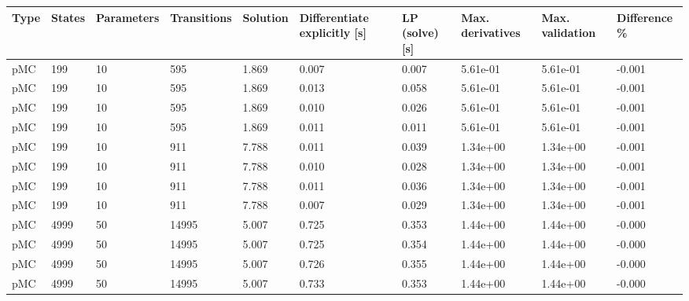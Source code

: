 \begin{tabular}{llllllllll}
\toprule
Type & States & Parameters & Transitions &  Solution & Differentiate explicitly [s] & LP (solve) [s] & Max. derivatives & Max. validation & Difference \% \\
\midrule
 pMC &    199 &         10 &         595 &     1.869 &                        0.007 &          0.007 &         5.61e-01 &        5.61e-01 &       -0.001 \\
 pMC &    199 &         10 &         595 &     1.869 &                        0.013 &          0.058 &         5.61e-01 &        5.61e-01 &       -0.001 \\
 pMC &    199 &         10 &         595 &     1.869 &                        0.010 &          0.026 &         5.61e-01 &        5.61e-01 &       -0.001 \\
 pMC &    199 &         10 &         595 &     1.869 &                        0.011 &          0.011 &         5.61e-01 &        5.61e-01 &       -0.001 \\
 pMC &    199 &         10 &         911 &     7.788 &                        0.011 &          0.039 &         1.34e+00 &        1.34e+00 &       -0.001 \\
 pMC &    199 &         10 &         911 &     7.788 &                        0.010 &          0.028 &         1.34e+00 &        1.34e+00 &       -0.001 \\
 pMC &    199 &         10 &         911 &     7.788 &                        0.011 &          0.036 &         1.34e+00 &        1.34e+00 &       -0.001 \\
 pMC &    199 &         10 &         911 &     7.788 &                        0.007 &          0.029 &         1.34e+00 &        1.34e+00 &       -0.001 \\
 pMC &   4999 &         50 &       14995 &     5.007 &                        0.725 &          0.353 &         1.44e+00 &        1.44e+00 &       -0.000 \\
 pMC &   4999 &         50 &       14995 &     5.007 &                        0.725 &          0.354 &         1.44e+00 &        1.44e+00 &       -0.000 \\
 pMC &   4999 &         50 &       14995 &     5.007 &                        0.726 &          0.355 &         1.44e+00 &        1.44e+00 &       -0.000 \\
 pMC &   4999 &         50 &       14995 &     5.007 &                        0.733 &          0.353 &         1.44e+00 &        1.44e+00 &       -0.000 \\

\end{tabular}
